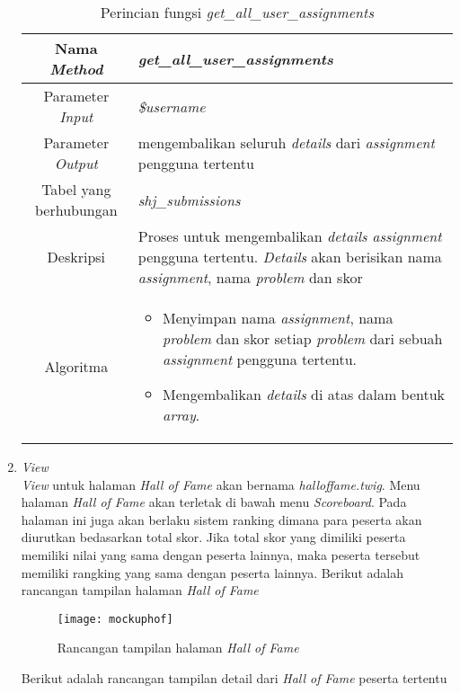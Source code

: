 \begin{enumerate}
	\begin{table}[H]
		\caption{Perincian fungsi \textit{get\_all\_user\_assignments}}
		\begin{tabular}{|c|p{11cm}|}
			\hline
			Nama \textit{Method} 	& 	\textit{get\_all\_user\_assignments} 	\\
			\hline
			Parameter \textit{Input} & \textit{\$username} \\
			\hline
			Parameter \textit{Output} &  mengembalikan seluruh \textit{details} dari \textit{assignment} pengguna tertentu\\
			\hline
			Tabel yang berhubungan & \textit{shj\_submissions} \\
			\hline
			Deskripsi	& Proses untuk mengembalikan \textit{details assignment} pengguna tertentu. \textit{Details} akan berisikan nama \textit{assignment}, nama \textit{problem} dan skor \\
			\hline
			Algoritma	& \begin{itemize}
				\item Menyimpan nama \textit{assignment}, nama \textit{problem} dan skor setiap \textit{problem} dari sebuah \textit{assignment} pengguna tertentu.
				\item Mengembalikan \textit{details} di atas dalam bentuk \textit{array}.
			\end{itemize} \\
			\hline
		\end{tabular}
	\end{table}
	
	\item \textit{View} \\
	\textit{View} untuk halaman \textit{Hall of Fame} akan bernama \textit{halloffame.twig}. Menu halaman \textit{Hall of Fame} akan terletak di bawah menu \textit{Scoreboard}. Pada halaman ini juga akan berlaku sistem ranking dimana para peserta akan diurutkan bedasarkan total skor. Jika total skor yang dimiliki peserta memiliki nilai yang sama dengan peserta lainnya, maka peserta tersebut memiliki rangking yang sama dengan peserta lainnya. Berikut adalah rancangan tampilan halaman \textit{Hall of Fame}
	
	\begin{figure}[H]
		\centering  
		\texttt{[image: mockuphof]}  
		\caption[Rancangan tampilan halaman \textit{Hall of Fame}]{Rancangan tampilan halaman \textit{Hall of Fame}} 
		\label{fig:mockuphof} 
	\end{figure}

	Berikut adalah rancangan tampilan detail dari \textit{Hall of Fame} peserta tertentu
	

\end{enumerate}
